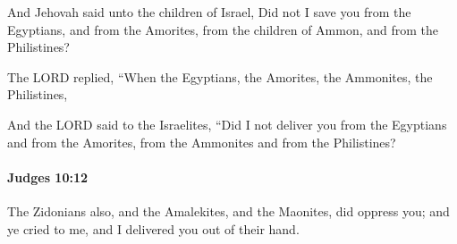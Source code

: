 			\begin{versebox}
					\item[BHS] 
					\item[ASV] And Jehovah said unto the children of Israel, Did not I save you from the Egyptians, and from the Amorites, from the children of Ammon, and from the Philistines?
					\item[NIV] The LORD replied, “When the Egyptians, the Amorites, the Ammonites, the Philistines,
					\item[NRSV] And the LORD said to the Israelites, “Did I not deliver you from the Egyptians and from the Amorites, from the Ammonites and from the Philistines?
			\end{versebox}

		\paragraph{Judges 10:12} %
			\label{JUDGES-10-12}

			The Zidonians also, and the Amalekites, and the Maonites, did oppress you; and ye cried to me, and I delivered you out of their hand.

